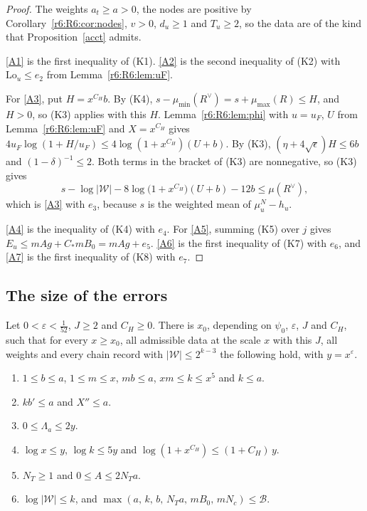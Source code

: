 \begin{proof}
The weights $a_t\ge a>0$, the nodes are positive by Corollary~\ref{r6:R6:cor:nodes}, $v>0$, $d_u\ge1$ and $T_u\ge2$, so the data are of the kind that Proposition~\ref{acct} admits.

\eqref{A1} is the first inequality of (K1). \eqref{A2} is the second inequality of (K2) with $\mathrm{Lo}_u\le e_2$ from Lemma~\ref{r6:R6:lem:uF}.

For \eqref{A3}, put $H=x^{C_H}b$. By (K4), $s-\mu_{\min}(R^\vee)=s+\mu_{\max}(R)\le H$, and $H>0$, so (K3) applies with this $H$. Lemma~\ref{r6:R6:lem:phi} with $u=u_F$, $U$ from Lemma~\ref{r6:R6:lem:uF} and $X=x^{C_H}$ gives $4u_F\log(1+H/u_F)\le4\log(1+x^{C_H})(U+b)$. By (K3), $(\eta+4\sqrt\epsilon)H\le6b$ and $(1-\delta)^{-1}\le2$. Both terms in the bracket of (K3) are nonnegative, so (K3) gives
\[
s-\log\lvert\mathcal W\rvert-8\log\big(1+x^{C_H}\big)(U+b)-12b\le\mu(R^\vee),
\]
which is \eqref{A3} with $e_3$, because $s$ is the weighted mean of $\mu^N_u-h_u$.

\eqref{A4} is the inequality of (K4) with $e_4$. For \eqref{A5}, summing (K5) over $j$ gives $E_u\le mAg+C_\ast mB_0=mAg+e_5$. \eqref{A6} is the first inequality of (K7) with $e_6$, and \eqref{A7} is the first inequality of (K8) with $e_7$.
\end{proof}

\subsection{The size of the errors}\label{r6:R6:sec:errors}

\begin{lemma}\label{r6:R6:lem:sizes}
Let $0<\varepsilon<\frac1{52}$, $J\ge2$ and $C_H\ge0$. There is $x_0$, depending on $\psi_0$, $\varepsilon$, $J$ and $C_H$, such that for every $x\ge x_0$, all admissible data at the scale $x$ with this $J$, all weights and every chain record with $\lvert\mathcal W\rvert\le2^{k-3}$ the following hold, with $y=x^{\varepsilon}$.
\begin{enumerate}
\item[(i)] $1\le b\le a$, $1\le m\le x$, $mb\le a$, $xm\le k\le x^5$ and $k\le a$.
\item[(ii)] $kb'\le a$ and $X''\le a$.
\item[(iii)] $0\le\Lambda_a\le2y$.
\item[(iv)] $\log x\le y$, $\log k\le5y$ and $\log(1+x^{C_H})\le(1+C_H)\,y$.
\item[(v)] $N_T\ge1$ and $0\le A\le2N_Ta$.
\item[(vi)] $\log\lvert\mathcal W\rvert\le k$, and $\max(a,\,k,\,b,\,N_Ta,\,mB_0,\,mN_c)\le\mathcal B$.
\end{enumerate}
\end{lemma}

